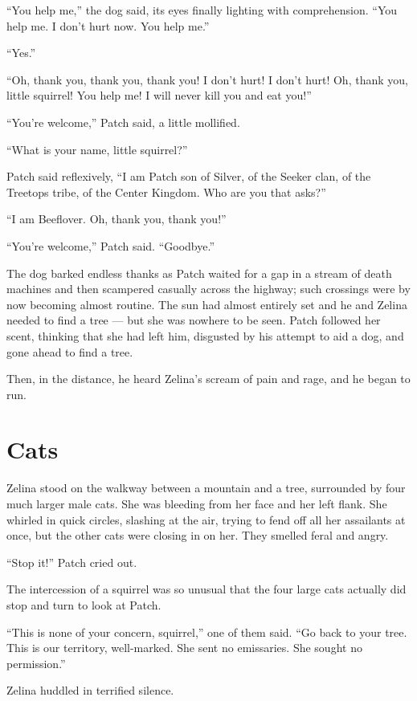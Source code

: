 \documentclass[12pt]{memoir}
\begin{document}
“You help me,” the dog said, its eyes finally lighting with
comprehension. “You help me. I don’t hurt now. You help me.”

“Yes.”

“Oh, thank you, thank you, thank you! I don’t hurt! I don’t hurt! Oh,
thank you, little squirrel! You help me! I will never kill you and eat
you!”

“You’re welcome,” Patch said, a little mollified.

“What is your name, little squirrel?”

Patch said reflexively, “I am Patch son of Silver, of the Seeker clan,
of the Treetops tribe, of the Center Kingdom. Who are you that asks?”

“I am Beeflover. Oh, thank you, thank you!”

“You’re welcome,” Patch said. “Goodbye.”

The dog barked endless thanks as Patch waited for a gap in a stream of
death machines and then scampered casually across the highway; such
crossings were by now becoming almost routine. The sun had almost
entirely set and he and Zelina needed to find a tree — but she was
nowhere to be seen. Patch followed her scent, thinking that she had
left him, disgusted by his attempt to aid a dog, and gone ahead to
find a tree.

Then, in the distance, he heard Zelina’s scream of pain and rage, and
he began to run.


\section{Cats}

Zelina stood on the walkway between a mountain and a tree, surrounded
by four much larger male cats. She was bleeding from her face and her
left flank. She whirled in quick circles, slashing at the air, trying
to fend off all her assailants at once, but the other cats were
closing in on her. They smelled feral and angry.

“Stop it!” Patch cried out.

The intercession of a squirrel was so unusual that the four large cats
actually did stop and turn to look at Patch.

“This is none of your concern, squirrel,” one of them said. “Go back
to your tree. This is our territory, well-marked. She sent no
emissaries. She sought no permission.”

Zelina huddled in terrified silence.
\end{document}
